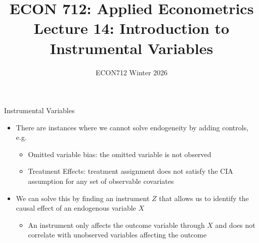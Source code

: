 \documentclass[9pt]{beamer}
\title{ECON 712: Applied Econometrics\\[0.3em]
       Lecture 14: Introduction to Instrumental Variables}
\date{ECON712 Winter 2026}
\begin{document}
\begin{frame}
  \titlepage
\end{frame}

\begin{frame}{Instrumental Variables}
  \begin{itemize}
    \item There are instances where we cannot solve endogeneity by adding controls, e.g.
    \begin{itemize}
      \item[$\blacktriangleright$] Omitted variable bias: the omitted variable is not observed
      \item[$\blacktriangleright$] Treatment Effects: treatment assignment does not satisfy the CIA assumption for any set of observable covariates
    \end{itemize}
    \medskip
    \item We can solve this by finding an instrument $Z$ that allows us to identify the causal effect of an endogenous variable $X$
    \begin{itemize}
      \item[$\blacktriangleright$] An instrument only affects the outcome variable through $X$ and does not correlate with unobserved variables affecting the outcome
    \end{itemize}
  \end{itemize}
\end{frame}
\end{document}

